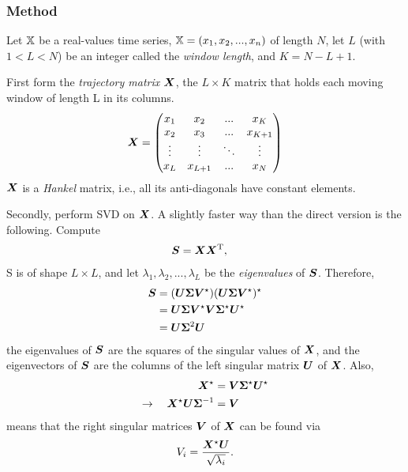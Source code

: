 \subsubsection{Method}
Let $\bm{\mathbb{X}}$ be a real-values time series, $\bm{\mathbb{X}} = (x_1, x_2, ..., x_n)$ of length $N$, let $L$ (with $1<L<N$) be an integer called the \emph{window length}, and $K = N - L + 1$.

First form the \emph{trajectory matrix} $\bm{X}$, the $L \times K$ matrix that holds each moving window of length L in its columns.
\[
	\bm{X} = \begin{pmatrix}
	x_1 & x_2 & ... & x_K \\
	x_2 & x_3 & ... & x_{K+1} \\
	\vdots & \vdots & \ddots & \vdots \\
	x_L & x_{L+1} & ... & x_{N} 
	\end{pmatrix}
\]
$\bm{X}$ is a \emph{Hankel} matrix, i.e., all its anti-diagonals have constant elements.

Secondly, perform SVD on $\bm{X}$. A slightly faster way than the direct version is the following. Compute
\begin{align*}
	\bm{S} &= \bm{X}\bm{X}^\textrm{T},
\end{align*}
S is of shape $L \times L$, and let $\lambda_1, \lambda_2,...,\lambda_L$ be the \emph{eigenvalues} of $\bm{S}$. Therefore,
\begin{align*}
	\bm{S} &= (\bm{U}\bm{\Sigma}\bm{V}^\star)(\bm{U}\bm{\Sigma}\bm{V}^\star)^\star \\
		&= \bm{U}\bm{\Sigma}\bm{V}^\star\bm{V}\bm{\Sigma}^\star\bm{U}^\star \\
		&= \bm{U}\bm{\Sigma}^2\bm{U}
\end{align*}
the eigenvalues of $\bm{S}$ are the squares of the singular values of $\bm{X}$, and the eigenvectors of $\bm{S}$ are the columns of the left singular matrix $\bm{U}$ of $\bm{X}$. Also,
\begin{align*}
	\bm{X}^\star &= \bm{V} \bm{\Sigma}^\star \bm{U}^\star \\
	\rightarrow \quad \bm{X}^\star \bm{U} \bm{\Sigma}^{-1} &= \bm{V} 
\end{align*}
means that the right singular matrices $\bm{V}$ of $\bm{X}$ can be found via
\begin{align*}
	V_i = \frac{\bm{X}^\star \bm{U}}{\sqrt{\lambda_i}}.
\end{align*}

